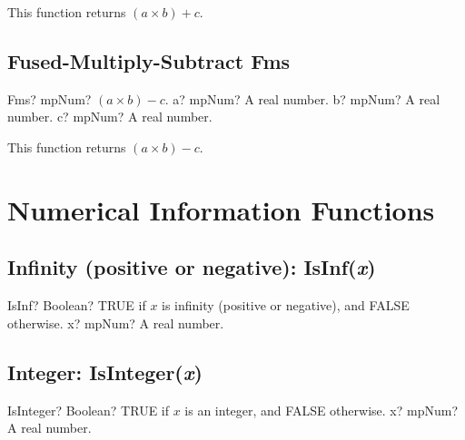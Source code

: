 \vspace{0.3cm}
This function returns $(a \times b) + c$.




\subsection{Fused-Multiply-Subtract Fms}

\begin{mpFunctionsExtract}
	\mpFunctionThree
	{Fms? mpNum? $(a \times b) - c$.}
	{a? mpNum? A real number.}
	{b? mpNum? A real number.}
	{c? mpNum? A real number.}
\end{mpFunctionsExtract}

\vspace{0.3cm}
This function returns $(a \times b) - c$.











\section{Numerical Information Functions}
\label{NumericalInformationFunctions}



\subsection{Infinity (positive or negative): IsInf(\textit{x})}

\begin{mpFunctionsExtract}
	\mpFunctionOne
	{IsInf? Boolean? TRUE if $x$ is infinity (positive or negative), and FALSE otherwise.}
	{x? mpNum? A real number.}
\end{mpFunctionsExtract}




\subsection{Integer: IsInteger(\textit{x})}

\begin{mpFunctionsExtract}
	\mpFunctionOne
	{IsInteger? Boolean? TRUE if $x$ is an integer, and FALSE otherwise.}
	{x? mpNum? A real number.}
\end{mpFunctionsExtract}




